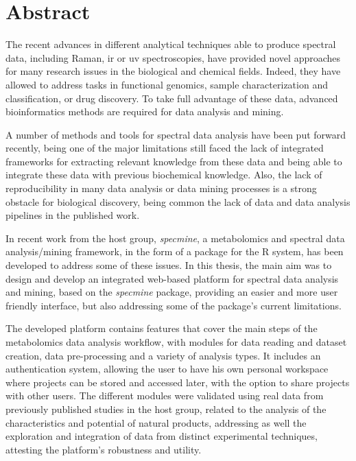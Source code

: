 
\chapter*{Abstract}

The recent advances in different analytical techniques able to produce spectral data, including Raman, \gls{ir} or \gls{uv} spectroscopies, have provided novel approaches for many research issues in the biological and chemical fields. Indeed, they have allowed to address tasks in functional genomics, sample characterization and classification, or drug discovery. To take full advantage of these data, advanced bioinformatics methods are required for data analysis and mining. 

A number of methods and tools for spectral data analysis have been put forward recently, being one of the major limitations still faced the lack of integrated frameworks for extracting relevant knowledge from these data and being able to integrate these data with previous biochemical knowledge. Also, the lack of reproducibility in many data analysis or data mining processes is a strong obstacle for biological discovery, being common the lack of data and data analysis pipelines in the published work.

In recent work from the host group, \textit{specmine}, a metabolomics and spectral data analysis/mining framework, in the form of a package for the R system, has been developed to address some of these issues. In this thesis, the main aim was to design and develop an integrated web-based platform for spectral data analysis and mining, based on the \textit{specmine} package, providing an easier and more user friendly interface, but also addressing some of the package's current limitations. 

The developed platform contains features that cover the main steps of the metabolomics data analysis workflow, with modules for data reading and dataset creation, data pre-processing and a variety of analysis types. It includes an authentication system, allowing the user to have his own personal workspace where projects can be stored and accessed later, with the option to share projects with other users. The different modules were validated using real data from previously published studies in the host group, related to the analysis of the characteristics and potential of natural products, addressing as well the exploration and integration of data from distinct experimental techniques, attesting the platform's robustness and utility.




